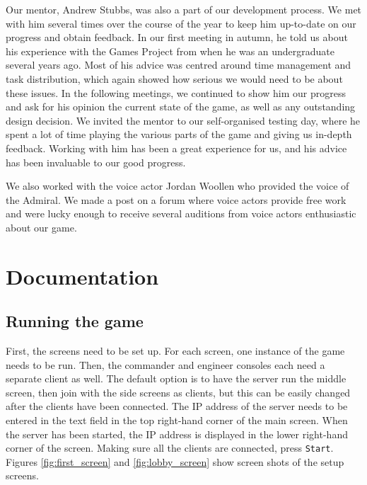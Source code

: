 \documentclass[a4paper,11pt]{article}
\begin{document}
Our mentor, Andrew Stubbs, was also a part of our development process. We met with him several times over the course of the year to keep him up-to-date on our progress and obtain feedback. In our first meeting in autumn, he told us about his experience with the Games Project from when he was an undergraduate several years ago. Most of his advice was centred around time management and task distribution, which again showed how serious we would need to be about these issues. In the following meetings, we continued to show him our progress and ask for his opinion the current state of the game, as well as any outstanding design decision. We invited the mentor to our self-organised testing day, where he spent a lot of time playing the various parts of the game and giving us in-depth feedback. Working with him has been a great experience for us, and his advice has been invaluable to our good progress.

We also worked with the voice actor Jordan Woollen who provided the voice of the Admiral. We made a post on a forum where voice actors provide free work and were lucky enough to receive several auditions from voice actors enthusiastic about our game.

\section{Documentation}


\subsection{Running the game}

First, the screens need to be set up. For each screen, one instance of the game needs to be run. Then, the commander and engineer consoles each need a separate client as well. The default option is to have the server run the middle screen, then join with the side screens as clients, but this can be easily changed after the clients have been connected. The IP address of the server needs to be entered in the text field in the top right-hand corner of the main screen. When the server has been started, the IP address is displayed in the lower right-hand corner of the screen. Making sure all the clients are connected, press \texttt{Start}. Figures \ref{fig:first_screen} and \ref{fig:lobby_screen} show screen shots of the setup screens.
\end{document}
